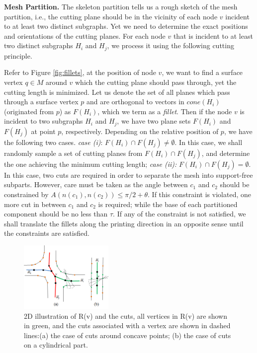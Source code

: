 \textbf{Mesh Partition.} The skeleton partition tells us a rough sketch of the mesh partition, i.e., the cutting plane should be in the vicinity of each node $v$ incident to at least two distinct subgraphs. Yet we need to determine the exact positions and orientations of the cutting planes. For each node $v$ that is incident to at least two distinct subgraphs $H_i$ and $H_j$, we process it using the following cutting principle.


Refer to Figure \ref{fig:fillets}, at the position of node $v$, we want to find a surface vertex $q \in M$ around $v$ which the cutting plane should pass through, yet the cutting length is minimized. Let us denote the set of all planes which pass through a surface vertex $p$ and are orthogonal to vectors in $cone(H_i)$ (originated from $p$)  as $F(H_i)$, which we term as a \emph{fillet}. Then if the node $v$ is incident to two subgraphs $H_i$ and $H_j$, we have two plane sets $F(H_i)$ and $F(H_j)$ at point $p$, respectively. Depending on the relative position of $p$, we have the following two cases. \emph{case (i)}: $F(H_i) \cap F(H_j) \neq \emptyset$. In this case, we shall randomly sample a set of cutting planes from $F(H_i) \cap F(H_j)$, and determine the one achieving the minimum cutting length; \emph{case (ii):} $F(H_i) \cap F(H_j) = \emptyset$. In this case, two cuts are required in order to separate the mesh into support-free subparts. However, care must be taken as the angle between $c_1$ and $c_2$ should be constrained by $A(n(c_1), n(c_2)) \leq \pi/2+ \theta$. If this constraint is violated, one more cut in between $c_1$ and $c_2$ is required; while the base of each partitioned component should be no less than $\tau$. If any of the constraint is not satisfied, we shall translate the fillets along the printing direction in an opposite sense until the constraints are satisfied.

\begin{figure}[tbp]
  \centering
  \includegraphics[width=0.4\textwidth]{figs/forward_tracing.png}
  \caption{\label{fig:forward_tracing}%
           2D illustration of R(v) and the cuts, all vertices in R(v) are shown in green, and the cuts associated with a vertex are shown in dashed lines:(a) the case of cuts around concave points; (b) the case of cuts on a cylindrical part.}
\end{figure}

